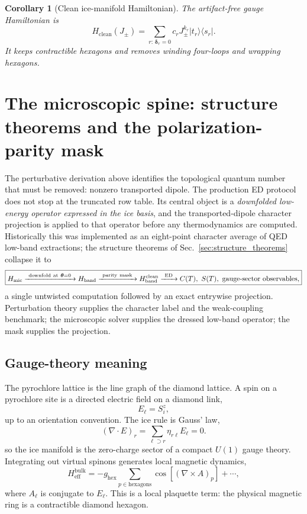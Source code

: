 \documentclass[11pt,letterpaper]{article}
\newcommand{\Jpm}{J_{\pm}}
\newcommand{\Heff}{H_{\mathrm{eff}}}
\newcommand{\Hclean}{H_{\mathrm{clean}}}
\newcommand{\bdelta}{\bm \delta}
\newcommand{\btheta}{\bm \theta}
\newcommand{\HB}{H_{\mathrm{band}}}
\newcommand{\Hmic}{H_{\mathrm{mic}}}
\theoremstyle{plain}
\newtheorem{corollary}{Corollary}
\theoremstyle{definition}
\begin{document}
\begin{corollary}[Clean ice-manifold Hamiltonian]
The artifact-free gauge Hamiltonian is
\begin{equation}
\boxed{
\Hclean(\Jpm)=
\sum_{r:\,\bdelta_r=0} c_r\Jpm^{k_r}|t_r\rangle\langle s_r| .
}
\label{eq:hclean}
\end{equation}
It keeps contractible hexagons and removes winding four-loops and wrapping
hexagons.
\end{corollary}

\section{The microscopic spine: structure theorems and the
polarization-parity mask}
\label{sec:qed-spine}

The perturbative derivation above identifies the topological quantum number
that must be removed: nonzero transported dipole.  The production ED protocol
does not stop at the truncated row table.  Its central object is a
\emph{downfolded low-energy operator expressed in the ice basis}, and the
transported-dipole character projection is applied to that operator before
any thermodynamics are computed.  Historically this was implemented as an
eight-point character average of QED low-band extractions; the structure
theorems of Sec.~\ref{sec:structure_theorems} collapse it to
\[
\boxed{
\Hmic
\xrightarrow{\ \mathrm{downfold\ at\ }\btheta=0\ }
\HB
\xrightarrow{\ \mathrm{parity\ mask}\ }
\HB^{\rm clean}
\xrightarrow{\ \mathrm{ED}\ }
C(T),\ S(T),\ \text{gauge-sector observables},
}
\]
a single untwisted computation followed by an exact entrywise projection.
Perturbation theory supplies the character label and the weak-coupling
benchmark; the microscopic solver supplies the dressed low-band operator; the
mask supplies the projection.

\subsection{Gauge-theory meaning}

The pyrochlore lattice is the line graph of the diamond lattice.  A spin on a
pyrochlore site is a directed electric field on a diamond link,
\[
E_\ell=S_i^z,
\]
up to an orientation convention.  The ice rule is Gauss' law,
\begin{equation}
(\nabla\cdot E)_r=\sum_{\ell\supset r}\eta_{r\ell}E_\ell=0.
\label{eq:gauss_law_new}
\end{equation}
so the ice manifold is the zero-charge sector of a compact $U(1)$ gauge
theory.  Integrating out virtual spinons generates local magnetic dynamics,
\begin{equation}
\Heff^{\mathrm{bulk}}
=-g_{\mathrm{hex}}\sum_{p\in\mathrm{hexagons}}
\cos\!\left[(\nabla\times A)_p\right]+\cdots ,
\label{eq:gauge_ring_new}
\end{equation}
where $A_\ell$ is conjugate to $E_\ell$.  This is a local plaquette term: the
physical magnetic ring is a contractible diamond hexagon.
\end{document}

